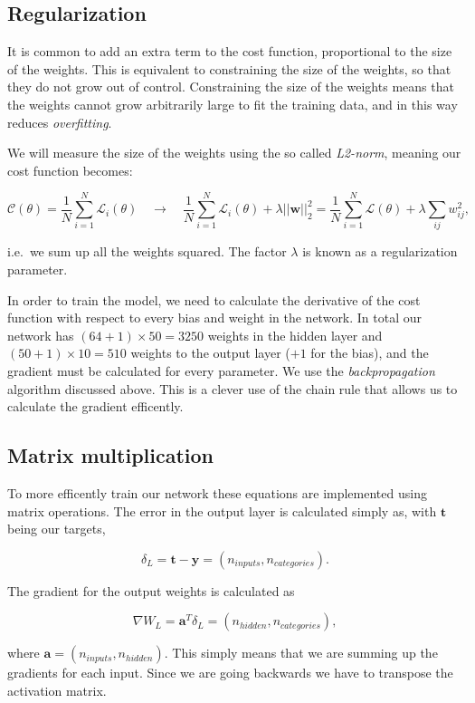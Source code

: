 \documentclass[%
oneside,                 %
final,                   %
10pt]{article}
\begin{document}
\subsection{Regularization}

It is common to add an extra term to the cost function, proportional
to the size of the weights.  This is equivalent to constraining the
size of the weights, so that they do not grow out of control.
Constraining the size of the weights means that the weights cannot
grow arbitrarily large to fit the training data, and in this way
reduces \emph{overfitting}.

We will measure the size of the weights using the so called \emph{L2-norm}, meaning our cost function becomes:  

$$  \mathcal{C}(\theta) = \frac{1}{N} \sum_{i=1}^N \mathcal{L}_i(\theta) \quad \rightarrow \quad
\frac{1}{N} \sum_{i=1}^N  \mathcal{L}_i(\theta) + \lambda \lvert \lvert \bm{w} \rvert \rvert_2^2 
= \frac{1}{N} \sum_{i=1}^N  \mathcal{L}(\theta) + \lambda \sum_{ij} w_{ij}^2,$$  

i.e.~we sum up all the weights squared. The factor $\lambda$ is known as a regularization parameter.

In order to train the model, we need to calculate the derivative of
the cost function with respect to every bias and weight in the
network.  In total our network has $(64 + 1)\times 50=3250$ weights in
the hidden layer and $(50 + 1)\times 10=510$ weights to the output
layer ($+1$ for the bias), and the gradient must be calculated for
every parameter.  We use the \emph{backpropagation} algorithm discussed
above. This is a clever use of the chain rule that allows us to
calculate the gradient efficently. 

\subsection{Matrix  multiplication}

To more efficently train our network these equations are implemented using matrix operations.  
The error in the output layer is calculated simply as, with $\bm{t}$ being our targets,  

$$ \delta_L = \bm{t} - \bm{y} = (n_{inputs}, n_{categories}) .$$  

The gradient for the output weights is calculated as  

$$ \nabla W_{L} = \bm{a}^T \delta_L   = (n_{hidden}, n_{categories}) ,$$

where $\bm{a} = (n_{inputs}, n_{hidden})$. This simply means that we are summing up the gradients for each input.  
Since we are going backwards we have to transpose the activation matrix.  
\end{document}
